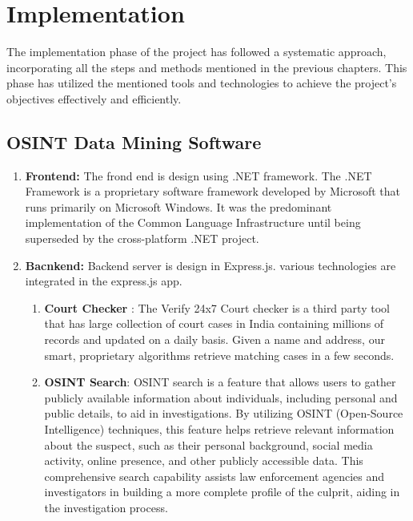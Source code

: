\chapter{Implementation}
\justify

The implementation phase of the project has followed a systematic approach, incorporating all the steps and methods mentioned in the previous chapters. This phase has utilized the mentioned tools and technologies to achieve the project's objectives effectively and efficiently. 

\section{OSINT Data Mining Software}
\begin{enumerate}[label=\roman*.]
    \item \textbf{Frontend:} The frond end is design using .NET framework. The .NET Framework is a proprietary software framework developed by Microsoft that runs primarily on Microsoft Windows. It was the predominant implementation of the Common Language Infrastructure until being superseded by the cross-platform .NET project.
    
    \item \textbf{Bacnkend:} Backend server is design in Express.js. various technologies are integrated in the express.js app.
    
    \begin{enumerate}[label=\arabic*.]
        \item \textbf{Court Checker} : The Verify 24x7 Court checker is a third party tool that has large collection of court cases in India containing millions of records and updated on a daily basis. Given a name and address, our smart, proprietary algorithms retrieve matching cases in a few seconds.
        
        \item \textbf{OSINT Search}: OSINT search is a feature that allows users to gather publicly available information about individuals, including personal and public details, to aid in investigations. By utilizing OSINT (Open-Source Intelligence) techniques, this feature helps retrieve relevant information about the suspect, such as their personal background, social
        media activity, online presence, and other publicly accessible data. This
        comprehensive search capability assists law enforcement agencies and investigators in building a more complete profile of the culprit, aiding in the investigation process.
        

\end{enumerate}
\end{enumerate}
